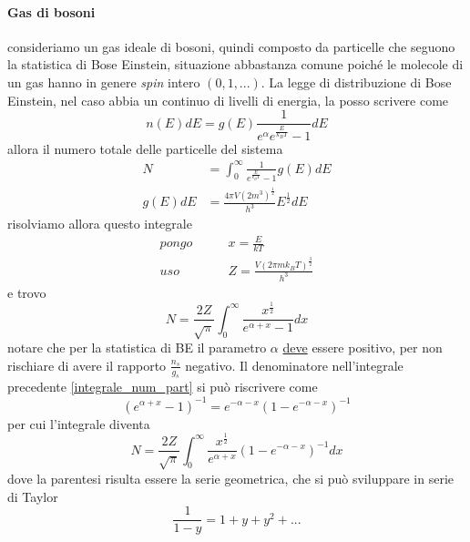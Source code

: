 \paragraph{Gas di bosoni} consideriamo un gas ideale di bosoni, quindi composto da particelle che seguono la statistica di Bose Einstein, situazione abbastanza comune poiché le molecole di un gas hanno in genere \textit{spin} intero $(0, 1, ...)$.
La legge di distribuzione di Bose Einstein, nel caso abbia un continuo di livelli di energia, la posso scrivere come
\begin{equation}
n(E)dE = g(E) \frac{1}{e^{ \alpha } e^{ \frac{E}{k_B T} } - 1 } dE
\end{equation}
allora il numero totale delle particelle del sistema
\begin{equation}
\begin{split}
N & = \int_0^{\infty} \frac{1}{e^{ \frac{E}{k_B T} } - 1} g(E) dE \\
g(E)dE & = \frac{4\pi V (2m^3)^{ \frac{1}{2} }}{h^3} E^{\frac{1}{2} } dE
\end{split}
\end{equation}
risolviamo allora questo integrale
\begin{equation}
\begin{split}
pongo & \quad\quad x = \frac{E}{kT} \\
uso & \quad\quad Z = \frac{V (2 \pi m k_B T)^{ \frac{3}{2} } }{h^3}
\end{split}
\end{equation}
e trovo
\begin{equation}
N = \frac{2Z}{\sqrt{\pi}} \int_0^{\infty} \frac{x^{ \frac{1}{2} }}{e^{ \alpha + x } - 1} dx
\label{integrale_num_part}
\end{equation}
notare che per la statistica di BE il parametro $\alpha$ \underline{deve} essere positivo, per non rischiare di avere il rapporto $\frac{n_s}{g_s}$ negativo.
Il denominatore nell'integrale precedente \ref{integrale_num_part} si può riscrivere come
\begin{equation}
(e^{ \alpha + x } - 1)^{-1} = e^{ - \alpha - x } (1 - e^{ - \alpha - x })^{ -1 }
\end{equation}
per cui l'integrale diventa
\begin{equation}
N = \frac{2Z}{\sqrt{\pi}} \int_0^{\infty} \frac{x^{ \frac{1}{2} }}{e^{ \alpha + x }} (1 - e^{ - \alpha - x })^{ -1 } dx
\end{equation}
dove la parentesi risulta essere la serie geometrica, che si può sviluppare in serie di Taylor
$$ \frac{1}{1-y} = 1 + y + y^2 + ... $$
